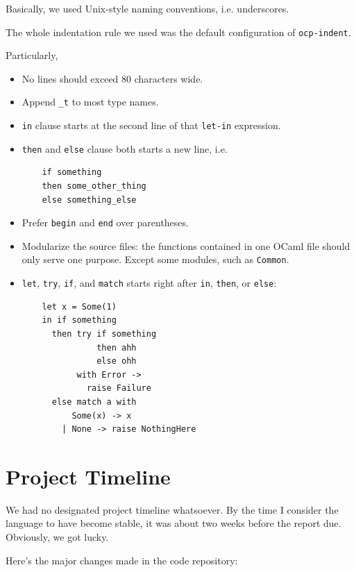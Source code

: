\documentclass{report}
\begin{document}
Basically, we used Unix-style naming conventions, i.e. underscores.

The whole indentation rule we used was the default configuration of \texttt{ocp-indent}.

Particularly,

\begin{itemize}
\item No lines should exceed 80 characters wide.
\item Append \texttt{\_t} to most type names.
\item \texttt{in} clause starts at the second line of that
  \texttt{let-in} expression.
\item \texttt{then} and \texttt{else} clause both starts a new line, i.e.
  \begin{verbatim}
    if something
    then some_other_thing
    else something_else
  \end{verbatim}
\item Prefer \texttt{begin} and \texttt{end} over parentheses.
\item Modularize the source files: the functions contained in one OCaml file should only serve one purpose. Except some modules, such as \texttt{Common}.
\item \texttt{let}, \texttt{try}, \texttt{if}, and \texttt{match} starts right after \texttt{in}, \texttt{then}, or \texttt{else}:
  \begin{verbatim}
    let x = Some(1)
    in if something
      then try if something
               then ahh
               else ohh
           with Error ->
             raise Failure
      else match a with
          Some(x) -> x
        | None -> raise NothingHere
  \end{verbatim}
\end{itemize}

\section{Project Timeline}

We had no designated project timeline whatsoever. By the time I consider the language to have become stable, it was about two weeks before the report due. Obviously, we got lucky.

Here's the major changes made in the code repository:
\end{document}
